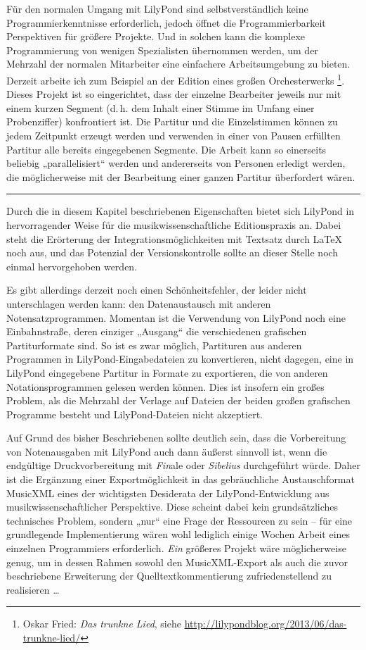 \documentclass[DIV=12]{scrreprt}
\begin{document}
Für den normalen Umgang mit LilyPond sind selbstverständlich keine Programmierkenntnisse erforderlich, jedoch öffnet die Programmierbarkeit Perspektiven für größere Projekte.
Und in solchen kann die komplexe Programmierung von wenigen Spezialisten übernommen werden, um der Mehrzahl der normalen Mitarbeiter eine einfachere Arbeitsumgebung zu bieten.
Derzeit arbeite ich zum Beispiel an der Edition eines großen Orchesterwerks%
\footnote{Oskar Fried: \emph{Das trunkne Lied}, siehe \url{http://lilypondblog.org/2013/06/das-trunkne-lied/}}.
Dieses Projekt ist so eingerichtet, dass der einzelne Bearbeiter jeweils nur mit einem kurzen Segment (d.\,h. dem Inhalt einer Stimme im Umfang einer Probenziffer) konfrontiert ist.
Die Partitur und die Einzelstimmen können zu jedem Zeitpunkt erzeugt werden und verwenden in einer von Pausen erfüllten Partitur alle bereits eingegebenen Segmente.
Die Arbeit kann so einerseits beliebig „parallelisiert“ werden und andererseits von Personen erledigt werden, die möglicherweise mit der Bearbeitung einer ganzen Partitur überfordert wären.

\bigskip
\hrule
\bigskip

Durch die in diesem Kapitel beschriebenen Eigenschaften bietet sich LilyPond in hervorragender Weise für die musikwissenschaftliche Editionspraxis an.
Dabei steht die Erörterung der Integrationsmöglichkeiten mit Textsatz durch \LaTeX{} noch aus, und das Potenzial der Versionskontrolle sollte an dieser Stelle noch einmal hervorgehoben werden.

Es gibt allerdings derzeit noch einen Schönheitsfehler, der leider nicht unterschlagen werden kann: den Datenaustausch mit anderen Notensatzprogrammen.
Momentan ist die Verwendung von LilyPond noch eine Einbahnstraße, deren einziger „Ausgang“ die verschiedenen grafischen Partiturformate sind.
So ist es zwar möglich, Partituren aus anderen Programmen in LilyPond-Eingabedateien zu konvertieren, nicht dagegen, eine in LilyPond eingegebene Partitur in Formate zu exportieren, die von anderen Notationsprogrammen gelesen werden können.
Dies ist insofern ein großes Problem, als die Mehrzahl der Verlage auf Dateien der beiden großen grafischen Programme besteht und LilyPond-Dateien nicht akzeptiert.

Auf Grund des bisher Beschriebenen sollte deutlich sein, dass die Vorbereitung von Notenausgaben mit LilyPond auch dann äußerst sinnvoll ist, wenn die endgültige Druckvorbereitung mit \emph{Fin}ale oder \emph{Sibelius} durchgeführt würde.
Daher ist die Ergänzung einer Exportmöglichkeit in das gebräuchliche Austauschformat MusicXML eines der wichtigsten Desiderata der LilyPond-Entwicklung aus musikwissenschaftlicher Perspektive.
Diese scheint dabei kein grundsätzliches technisches Problem, sondern „nur“ eine Frage der Ressourcen zu sein -- für eine grundlegende Implementierung wären wohl lediglich einige Wochen Arbeit eines einzelnen Programmiers erforderlich.
\emph{Ein} größeres Projekt wäre möglicherweise genug, um in dessen Rahmen sowohl den MusicXML-Export als auch die zuvor beschriebene Erweiterung der Quelltextkommentierung zufriedenstellend zu realisieren \dots
\end{document}
